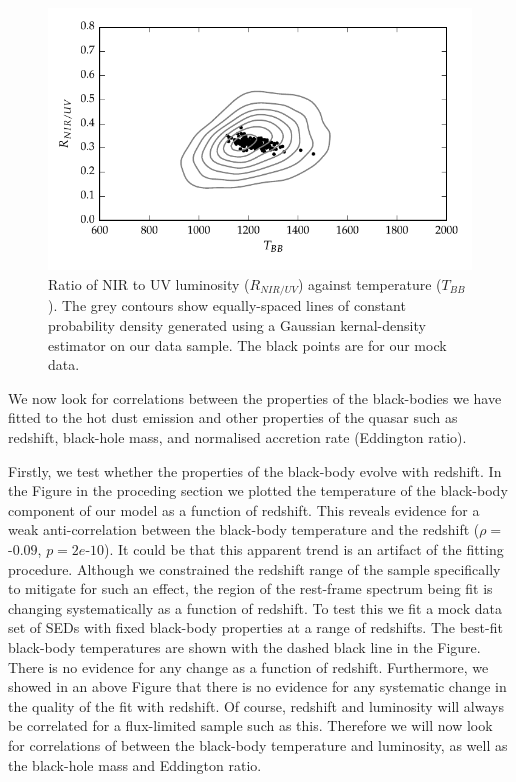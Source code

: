 \begin{figure}
  \centering
  \includegraphics[width=\textwidth]{figures/chapter06/ratio_tbb_contours.pdf}
  \caption{Ratio of NIR to UV luminosity ($R_{NIR/UV}$) against temperature ($T_{BB}$). The grey contours show equally-spaced lines of constant probability density generated using a Gaussian kernal-density estimator on our data sample. The black points are for our mock data.}
  \label{fig:}
\end{figure}

We now look for correlations between the properties of the black-bodies we have fitted to the hot dust emission and other properties of the quasar such as redshift, black-hole mass, and normalised accretion rate (Eddington ratio). 

Firstly, we test whether the properties of the black-body evolve with redshift. 
In the Figure in the proceding section we plotted the temperature of the black-body component of our model as a function of redshift. 
This reveals evidence for a weak anti-correlation between the black-body temperature and the redshift ($\rho =$ -$0.09$, $p = 2e$-$10$). 
It could be that this apparent trend is an artifact of the fitting procedure. 
Although we constrained the redshift range of the sample specifically to mitigate for such an effect, the region of the rest-frame spectrum being fit is changing systematically as a function of redshift. 
To test this we fit a mock data set of SEDs with fixed black-body properties at a range of redshifts. 
The best-fit black-body temperatures are shown with the dashed black line in the Figure. 
There is no evidence for any change as a function of redshift. 
Furthermore, we showed in an above Figure that there is no evidence for any systematic change in the quality of the fit with redshift. 
Of course, redshift and luminosity will always be correlated for a flux-limited sample such as this. 
Therefore we will now look for correlations of between the black-body temperature and luminosity, as well as the black-hole mass and Eddington ratio.  

